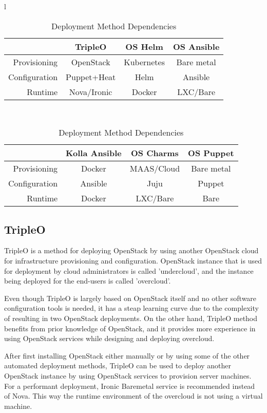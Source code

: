 \documentclass[officiallayout]{tktla}
\begin{document}
\begin{table}[t]
\centering
\begin{tabular}{ l }
\begin{tabular} {r | c c c } \\
              & TripleO     & OS Helm     & OS Ansible  \\
\hline
Provisioning  & OpenStack   & Kubernetes  & Bare metal  \\
Configuration & Puppet+Heat & Helm        & Ansible     \\
Runtime       & Nova/Ironic & Docker      & LXC/Bare    \\
\end{tabular} \\
\begin{tabular} {r | c c c } \\
              & Kolla Ansible & OS Charms   & OS Puppet \\
\hline
Provisioning  & Docker        & MAAS/Cloud  & Bare metal\\
Configuration & Ansible       & Juju        & Puppet    \\
Runtime       & Docker        & LXC/Bare    & Bare      \\
\end{tabular}
\end{tabular}
\caption{Deployment Method Dependencies}
\label{tab:dependencies}
\end{table}

\subsection{TripleO}

TripleO \cite{tripleo} is a method for deploying OpenStack by using another
OpenStack cloud for infrastructure provisioning and configuration. OpenStack
instance that is used for deployment by cloud administrators is called
'undercloud', and the instance being deployed for the end-users is called
'overcloud'.

Even though TripleO is largely based on OpenStack itself and no other software
configuration tools is needed, it has a steap learning curve due to the
complexity of resulting in two OpenStack deployments. On the other hand,
TripleO method benefits from prior knowledge of OpenStack, and it provides more
experience in using OpenStack services while designing and deploying overcloud.

After first installing OpenStack either manually or by using some of the other
automated deployment methods, TripleO can be used to deploy another OpenStack
instance by using OpenStack services to provision server machines. For a
performant deployment, Ironic Baremetal service is recommended instead of Nova.
This way the runtime environment of the overcloud is not using a virtual
machine.
\end{document}
